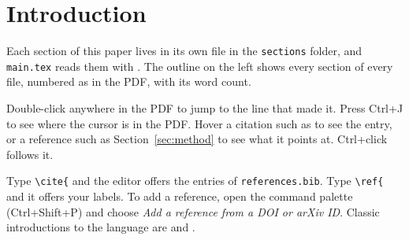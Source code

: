 \section{Introduction}
\label{sec:intro}

Each section of this paper lives in its own file in the \texttt{sections} folder, and \texttt{main.tex} reads them
with \verb||. The outline on the left shows every section of every file, numbered as in the PDF, with its word
count.

Double-click anywhere in the PDF to jump to the line that made it. Press Ctrl+J to see where the cursor is in the
PDF. Hover a citation such as \citet{knuth1984texbook} to see the entry, or a reference such as
Section~\ref{sec:method} to see what it points at. Ctrl+click follows it.

Type \verb|\cite{| and the editor offers the entries of \texttt{references.bib}. Type \verb|\ref{| and it offers
your labels. To add a reference, open the command palette (Ctrl+Shift+P) and choose \emph{Add a reference from a DOI
or arXiv ID}. Classic introductions to the language are \citet{lamport1994latex} and \citet{mittelbach2004companion}.
